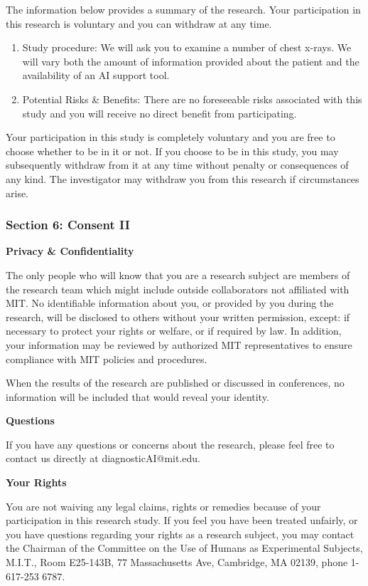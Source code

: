 The information below provides a summary of the research. Your participation
in this research is voluntary and you can withdraw at any time.
\begin{enumerate}
\item Study procedure: We will ask you to examine a number of chest x-rays.
We will vary both the amount of information provided about the patient
and the availability of an AI support tool.
\item Potential Risks \& Benefits: There are no foreseeable risks associated
with this study and you will receive no direct benefit from participating.
\end{enumerate}
%
Your participation in this study is completely voluntary and you are
free to choose whether to be in it or not. If you choose to be in
this study, you may subsequently withdraw from it at any time without
penalty or consequences of any kind. The investigator may withdraw
you from this research if circumstances arise.

\subsubsection*{Section 6: Consent II}

\textbf{Privacy \& Confidentiality}

The only people who will know that you are a research subject are
members of the research team which might include outside collaborators
not affiliated with MIT. No identifiable information about you, or
provided by you during the research, will be disclosed to others without
your written permission, except: if necessary to protect your rights
or welfare, or if required by law. In addition, your information may
be reviewed by authorized MIT representatives to ensure compliance
with MIT policies and procedures.

When the results of the research are published or discussed in conferences,
no information will be included that would reveal your identity.

\textbf{Questions}

If you have any questions or concerns about the research, please feel
free to contact us directly at diagnosticAI@mit.edu.

\textbf{Your Rights}

You are not waiving any legal claims, rights or remedies because of
your participation in this research study. If you feel you have been
treated unfairly, or you have questions regarding your rights as a
research subject, you may contact the Chairman of the Committee on
the Use of Humans as Experimental Subjects, M.I.T., Room E25-143B,
77 Massachusetts Ave, Cambridge, MA 02139, phone 1-617-253 6787.

